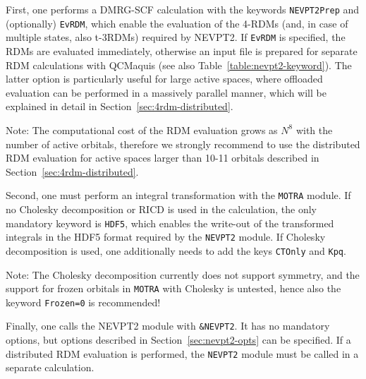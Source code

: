 \documentclass[bibliography=totoc,12pt,a4paper]{scrartcl}
\newcommand{\kwd}[1]{\texttt{#1}}
\begin{document}
First, one performs a DMRG-SCF calculation with the keywords \kwd{NEVPT2Prep} and (optionally) \kwd{EvRDM}, which enable the evaluation of the 4-RDMs (and, in case of multiple states, also t-3RDMs) required by NEVPT2. If \kwd{EvRDM} is specified, the RDMs are evaluated immediately, otherwise an input file is prepared for separate RDM calculations with QCMaquis (see also Table~\ref{table:nevpt2-keyword}). The latter option is particularly useful for large active spaces, where offloaded evaluation can be performed in a massively parallel manner, which will be explained in detail in Section~\ref{sec:4rdm-distributed}.

\begin{framed}
 \noindent Note: The computational cost of the RDM evaluation grows as $N^8$ with the number of active orbitals, therefore we strongly recommend to use the distributed RDM evaluation for active spaces larger than 10-11 orbitals described in Section~\ref{sec:4rdm-distributed}.
\end{framed}

Second, one must perform an integral transformation with the \kwd{MOTRA} module. If no Cholesky decomposition or RICD is used in the calculation, the only mandatory keyword is \kwd{HDF5}, which enables the write-out of the transformed integrals in the HDF5 format required by the \kwd{NEVPT2} module. If Cholesky decomposition is used, one additionally needs to add the keys \kwd{CTOnly} and \kwd{Kpq}.

\begin{framed}
 \noindent Note: The Cholesky decomposition currently does not support symmetry, and the support for frozen orbitals in \kwd{MOTRA} with Cholesky is untested, hence also the keyword \kwd{Frozen=0} is recommended!
\end{framed}

Finally, one calls the NEVPT2 module with \kwd{\&NEVPT2}. It has no mandatory options, but options described in Section~\ref{sec:nevpt2-opts} can be specified. If a distributed RDM evaluation is performed, the \kwd{NEVPT2} module must be called in a separate calculation.
\end{document}
